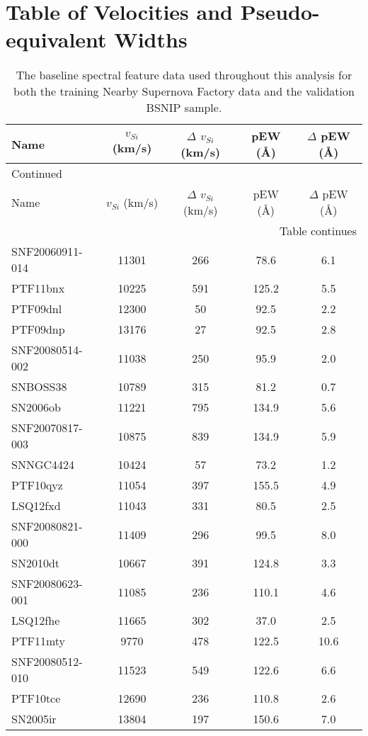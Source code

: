 \chapter{Table of \siliconii{} Velocities and Pseudo-equivalent Widths}
\label{app:snf_data_table}

\begin{longtable}{lcccc}
\caption{The baseline spectral feature data used throughout this analysis for both the training Nearby Supernova Factory data and the validation BSNIP sample.} \label{snf_data_table}\\
\toprule
Name & $v_{Si}$ (km/s) & $\Delta$ $v_{Si}$ (km/s) & pEW (\AA) & $\Delta$ pEW (\AA) \\
\midrule
\endfirsthead
\multicolumn{5}{l}{Continued}\\
\toprule
Name & $v_{Si}$ (km/s) & $\Delta$ $v_{Si}$ (km/s) & pEW (\AA) & $\Delta$ pEW (\AA) \\
\midrule
\endhead
\midrule
\multicolumn{5}{r}{Table continues}\\
\midrule
\endfoot
\bottomrule
\endlastfoot
SNF20060911-014 & 11301 & 266 & 78.6 & 6.1 \\
PTF11bnx & 10225 & 591 & 125.2 & 5.5 \\
PTF09dnl & 12300 & 50 & 92.5 & 2.2 \\
PTF09dnp & 13176 & 27 & 92.5 & 2.8 \\
SNF20080514-002 & 11038 & 250 & 95.9 & 2.0 \\
SNBOSS38 & 10789 & 315 & 81.2 & 0.7 \\
SN2006ob & 11221 & 795 & 134.9 & 5.6 \\
SNF20070817-003 & 10875 & 839 & 134.9 & 5.9 \\
SNNGC4424 & 10424 & 57 & 73.2 & 1.2 \\
PTF10qyz & 11054 & 397 & 155.5 & 4.9 \\
LSQ12fxd & 11043 & 331 & 80.5 & 2.5 \\
SNF20080821-000 & 11409 & 296 & 99.5 & 8.0 \\
SN2010dt & 10667 & 391 & 124.8 & 3.3 \\
SNF20080623-001 & 11085 & 236 & 110.1 & 4.6 \\
LSQ12fhe & 11665 & 302 & 37.0 & 2.5 \\
PTF11mty & 9770 & 478 & 122.5 & 10.6 \\
SNF20080512-010 & 11523 & 549 & 122.6 & 6.6 \\
PTF10tce & 12690 & 236 & 110.8 & 2.6 \\
SN2005ir & 13804 & 197 & 150.6 & 7.0 \\

\end{longtable}
